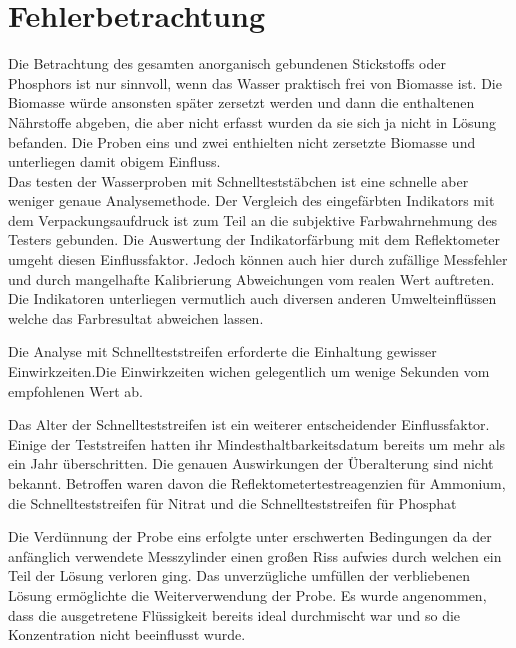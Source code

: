 \chapter{Fehlerbetrachtung}
\label{sec:fehler}

Die Betrachtung des gesamten anorganisch gebundenen Stickstoffs oder Phosphors ist nur sinnvoll, wenn das Wasser praktisch frei von Biomasse ist. Die Biomasse würde ansonsten später zersetzt werden und dann die enthaltenen Nährstoffe abgeben, die aber nicht erfasst wurden da sie sich ja nicht in Lösung befanden. Die Proben eins und zwei enthielten nicht zersetzte Biomasse und unterliegen damit obigem Einfluss. \\
Das testen der Wasserproben mit Schnellteststäbchen ist eine schnelle aber weniger genaue Analysemethode. Der Vergleich des eingefärbten Indikators mit dem Verpackungsaufdruck ist zum Teil an die subjektive Farbwahrnehmung des Testers gebunden. Die Auswertung der Indikatorfärbung mit dem Reflektometer umgeht diesen Einflussfaktor. Jedoch können auch hier durch zufällige Messfehler und durch mangelhafte Kalibrierung Abweichungen vom realen Wert auftreten. Die Indikatoren unterliegen vermutlich auch diversen anderen Umwelteinflüssen welche das Farbresultat abweichen lassen. %

Die Analyse mit Schnellteststreifen erforderte die Einhaltung gewisser Einwirkzeiten.Die Einwirkzeiten wichen gelegentlich um wenige Sekunden vom empfohlenen Wert ab.

Das Alter der Schnellteststreifen ist ein weiterer entscheidender Einflussfaktor. Einige der Teststreifen hatten ihr Mindesthaltbarkeitsdatum bereits um mehr als ein Jahr überschritten. Die genauen Auswirkungen der Überalterung sind nicht bekannt.
Betroffen waren davon die Reflektometertestreagenzien für Ammonium, die Schnellteststreifen für Nitrat und die Schnellteststreifen für Phosphat

Die Verdünnung der Probe eins erfolgte unter erschwerten Bedingungen da der anfänglich verwendete Messzylinder einen großen Riss aufwies durch welchen ein Teil der Lösung verloren ging. Das unverzügliche umfüllen der verbliebenen Lösung ermöglichte die Weiterverwendung der Probe. Es wurde angenommen, dass die ausgetretene Flüssigkeit bereits ideal durchmischt war und so die Konzentration nicht beeinflusst wurde.  

